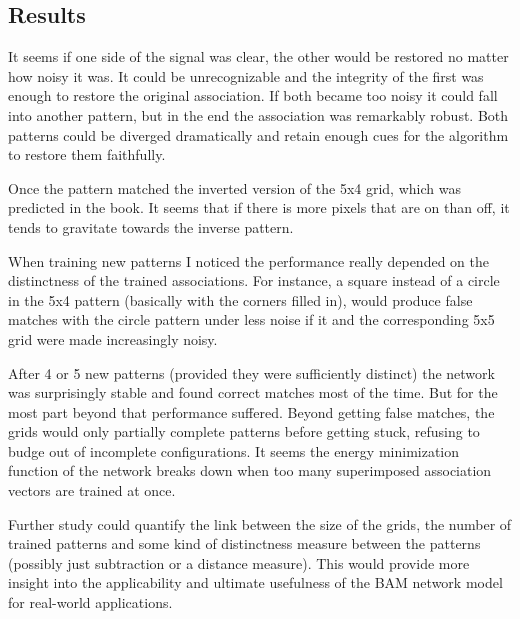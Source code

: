 \documentclass[12pt]{article}
\begin{document}
\subsection{Results}

It seems if one side of the signal was clear, the other would be restored no matter how noisy it was.  It could be unrecognizable and the integrity of the first was enough to restore the original association.  If both became too noisy it could fall into another pattern, but in the end the association was remarkably robust.  Both patterns could be diverged dramatically and retain enough cues for the algorithm to restore them faithfully.

Once the pattern matched the inverted version of the 5x4 grid, which was predicted in the book.  It seems that if there is more pixels that are on than off, it tends to gravitate towards the inverse pattern.

When training new patterns I noticed the performance really depended on the distinctness of the trained associations.  For instance, a square instead of a circle in the 5x4 pattern (basically with the corners filled in), would produce false matches with the circle pattern under less noise if it and the corresponding 5x5 grid were made increasingly noisy.  

After 4 or 5 new patterns (provided they were sufficiently distinct) the network was surprisingly stable and found correct matches most of the time.  But for the most part beyond that performance suffered.  Beyond getting false matches, the grids would only partially complete patterns before getting stuck, refusing to budge out of incomplete configurations.  It seems the energy minimization function of the network breaks down when too many superimposed association vectors are trained at once.  

Further study could quantify the link between the size of the grids, the number of trained patterns and some kind of distinctness measure between the patterns (possibly just subtraction or a distance measure).  This would provide more insight into the applicability and ultimate usefulness of the BAM network model for real-world applications.
\end{document}
